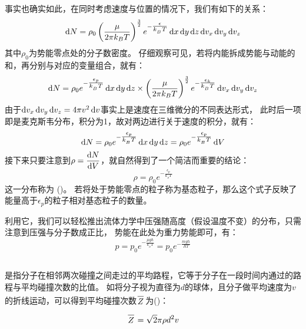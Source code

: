 事实也确实如此，在同时考虑速度与位置的情况下，我们有如下的关系：
\begin{equation}
    \dif{N}=\rho_{0}\left(\frac \mu{2\pi k_{B}T}\right)^{\frac{3}{2}}e^{-\tfrac{\epsilon}{k_{_B}T}}
    \dif{x}\dif{y}\dif{z}\dif{v_{x}}\dif{v_{y}}\dif{v_{z}}
    \nonumber
\end{equation}
其中$\rho_{0}$为势能零点处的分子数密度。
仔细观察可见，若将内能拆成势能与动能的和，再分别与对应的变量组合，就有：
\begin{equation}
    \dif{N} =\rho_{0}e^{-\tfrac{\epsilon_{p}}{k_{_B}T}}\dif{x}\dif{y}\dif{z}\times\left(\frac \mu{2\pi k_{B}T}\right)^{\frac{3}{2}}e^{-\tfrac{\epsilon_{k}}{k_{_B}T}}
    \dif{v_{x}}\dif{v_{y}}\dif{v_{z}}
    \nonumber
\end{equation}
由于$\dif{v_{x}}\dif{v_{y}}\dif{v_{z}}=4\pi v^{2}\dif{v}$事实上是速度在三维微分的不同表达形式，
此时后一项即是麦克斯韦分布，积分为1，故对两边进行关于速度的积分，就有：
\begin{equation}
    \dif{N} =\rho_{0}e^{-\tfrac{\epsilon_{p}}{k_{_B}T}}\dif{x}\dif{y}\dif{z} =\rho_{0}e^{-\tfrac{\epsilon_{p}}{k_{_B}T}}\dif{V}
    \nonumber
\end{equation}
接下来只要注意到$\rho = \dfrac{\dif{N}}{\dif{V}}$，就自然得到了一个简洁而重要的结论：
\begin{equation}
    \rho = \rho_{0}e^{-\tfrac{\epsilon_{p}}{k_{_B}T}}
    \nonumber
\end{equation}
这一分布称为 ()。
若将处于势能零点的粒子称为基态粒子，那么这个式子反映了能量高于$\epsilon_{p}$的粒子相对基态粒子的数量。

利用它，我们可以轻松推出流体力学中压强随高度（假设温度不变）的分布，只需注意到压强与分子数成正比，
势能在此处为重力势能即可，有：
\begin{equation}
    p = p_{0}e^{-\tfrac{\mu gh}{k_{_B}T}} = p_{0}e^{-\tfrac{mgh}{RT}}
    \nonumber
\end{equation}
\subsection[平均自由程]{}
 是指分子在相邻两次碰撞之间走过的平均路程，它等于分子在一段时间内通过的路程与平均碰撞次数的比值。
如将分子视为直径为$d$的球体，且分子做平均速度为$v$的折线运动，可以得到平均碰撞次数$\upperline{Z}$为()：
\begin{equation}
    \upperline{Z} = \sqrt{2}\pi \rho d^{2} v
    \nonumber
\end{equation}

